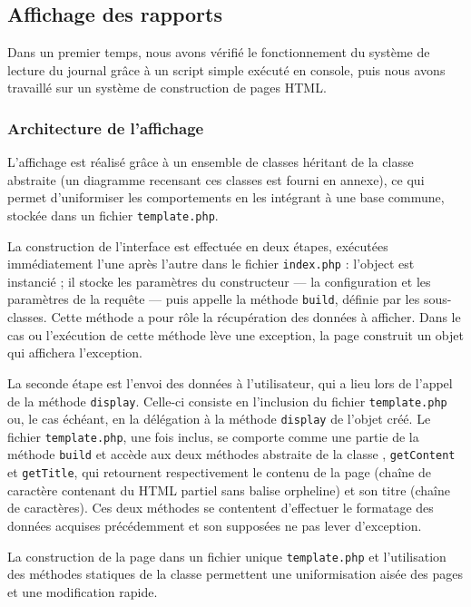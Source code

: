 \subsection{Affichage des rapports}

Dans un premier temps, nous avons vérifié le fonctionnement du système de lecture du journal grâce à un script simple exécuté en console, puis nous avons travaillé sur un système de construction de pages HTML.

\subsubsection{Architecture de l’affichage}

L’affichage est réalisé grâce à un ensemble de classes héritant de la classe abstraite  (un diagramme recensant ces classes est fourni en annexe), ce qui permet d’uniformiser les comportements en les intégrant à une base commune, stockée dans un fichier \texttt{template.php}.

La construction de l’interface est effectuée en deux étapes, exécutées immédiatement l’une après l’autre dans le fichier \texttt{index.php} : l’object  est instancié ; il stocke les paramètres du constructeur — la configuration et les paramètres de la requête — puis appelle la méthode \texttt{build}, définie par les sous-classes. Cette méthode a pour rôle la récupération des données à afficher. Dans le cas ou l’exécution de cette méthode lève une exception, la page construit un objet  qui affichera l’exception.

La seconde étape est l’envoi des données à l’utilisateur, qui a lieu lors de l’appel de la méthode \texttt{display}. Celle-ci consiste en l’inclusion du fichier \texttt{template.php} ou, le cas échéant, en la délégation à la méthode \texttt{display} de l’objet  créé. Le fichier \texttt{template.php}, une fois inclus, se comporte comme une partie de la méthode \texttt{build} et accède aux deux méthodes abstraite de la classe , \texttt{getContent} et \texttt{getTitle}, qui retournent respectivement le contenu de la page (chaîne de caractère contenant du HTML partiel sans balise orpheline) et son titre (chaîne de caractères). Ces deux méthodes se contentent d’effectuer le formatage des données acquises précédemment et son supposées ne pas lever d’exception.

La construction de la page dans un fichier unique \texttt{template.php} et l’utilisation des méthodes statiques de la classe  permettent une uniformisation aisée des pages et une modification rapide.

